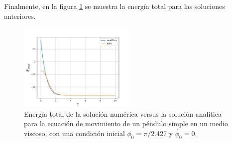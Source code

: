 \documentclass[letterpaper,oneside]{article}
\begin{document}
Finalmente, en la figura \ref{energia} se muestra la energía total para las soluciones anteriores.
\begin{figure}
    \centering    
    \includegraphics[width=0.5\textwidth]{Tarea 2/Grafico energia con perturbacion.pdf}
    \caption{Energía total de la solución numérica versus la solución analítica para la ecuación de movimiento de un péndulo simple en un medio viscoso, con una condición inicial $\phi_0=\pi/2.427$ y $\dot{\phi_0}=0$.}
    \label{energia}
\end{figure}{}
\end{document}
